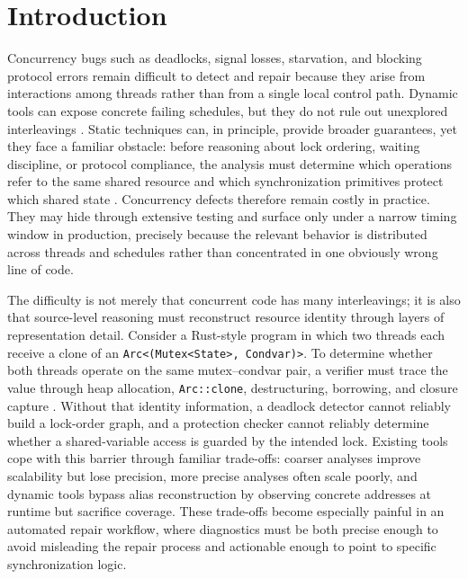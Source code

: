 \documentclass[sigconf]{acmart}
\begin{document}
\maketitle


\section{Introduction}
\label{sec:introduction}
Concurrency bugs such as deadlocks, signal losses, starvation, and blocking protocol errors remain difficult to detect and repair because they arise from interactions among threads rather than from a single local control path. Dynamic tools can expose concrete failing schedules, but they do not rule out unexplored interleavings \cite{Godefroid1997VeriSoft,Musuvathi2008Heisenbugs,Burckhardt2010RandomizedScheduler}. Static techniques can, in principle, provide broader guarantees, yet they face a familiar obstacle: before reasoning about lock ordering, waiting discipline, or protocol compliance, the analysis must determine which operations refer to the same shared resource and which synchronization primitives protect which shared state \cite{Engler2003RacerX,Flanagan2000TypeBasedRace,Flanagan2003Atomicity,Boyapati2002Ownership,Naik2006StaticRaceJava}. Concurrency defects therefore remain costly in practice. They may hide through extensive testing and surface only under a narrow timing window in production, precisely because the relevant behavior is distributed across threads and schedules rather than concentrated in one obviously wrong line of code.

The difficulty is not merely that concurrent code has many interleavings; it is also that source-level reasoning must reconstruct resource identity through layers of representation detail. Consider a Rust-style program in which two threads each receive a clone of an \texttt{Arc<(Mutex<State>, Condvar)>}. To determine whether both threads operate on the same mutex--condvar pair, a verifier must trace the value through heap allocation, \texttt{Arc::clone}, destructuring, borrowing, and closure capture \cite{Boyapati2002Ownership,Pratikakis2006Locksmith,Naik2006StaticRaceJava}. Without that identity information, a deadlock detector cannot reliably build a lock-order graph, and a protection checker cannot reliably determine whether a shared-variable access is guarded by the intended lock. Existing tools cope with this barrier through familiar trade-offs: coarser analyses improve scalability but lose precision, more precise analyses often scale poorly, and dynamic tools bypass alias reconstruction by observing concrete addresses at runtime but sacrifice coverage. These trade-offs become especially painful in an automated repair workflow, where diagnostics must be both precise enough to avoid misleading the repair process and actionable enough to point to specific synchronization logic.
\end{document}
